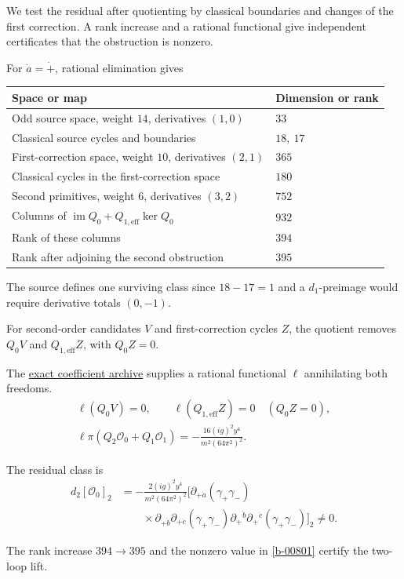 \documentclass[11pt]{article}
\numberwithin{equation}{section}
\numberwithin{figure}{section}
\numberwithin{table}{section}
\begin{document}
\begin{proofbox}
We test the residual after quotienting by classical boundaries and changes of the first correction. A rank increase and a rational functional give independent certificates that the obstruction is nonzero.

For $\dot a=\dot+$, rational elimination gives

{\small\renewcommand{\arraystretch}{1.25}\setlength{\tabcolsep}{4pt}
\begin{xltabular}{\linewidth}{@{}>{\raggedright\arraybackslash}X>{\raggedright\arraybackslash}X@{}}
\toprule
Space or map & Dimension or rank\\
\midrule\endhead
Odd source space, weight $14$, derivatives $(1,0)$ & $33$\\
Classical source cycles and boundaries & $18,\ 17$\\
First-correction space, weight $10$, derivatives $(2,1)$ & $365$\\
Classical cycles in the first-correction space & $180$\\
Second primitives, weight $6$, derivatives $(3,2)$ & $752$\\
Columns of $\operatorname{im}Q_0+Q_{1,\mathrm{eff}}\ker Q_0$ & $932$\\
Rank of these columns & $394$\\
Rank after adjoining the second obstruction & $395$\\
\bottomrule
\end{xltabular}}

The source defines one surviving class since $18-17=1$ and a $d_1$-preimage would require derivative totals $(0,-1)$.

For second-order candidates $V$ and first-correction cycles $Z$, the quotient removes $Q_0V$ and $Q_{1,\mathrm{eff}}Z$, with $Q_0Z=0$.

The \href{https://github.com/lbotao399-stack/All-loop-holomorphic-kernels/raw/main/SQED_two_loop_repro.zip}{exact coefficient archive} supplies a rational functional $\ell$ annihilating both freedoms.
\begin{equation}\label{b-00801}
\begin{gathered}
\ell(Q_0V)=0,\qquad
\ell(Q_{1,\mathrm{eff}}Z)=0\quad (Q_0Z=0),\\
\ell\pi(Q_2\mathcal O_0+Q_1\mathcal O_1)
=-\frac{16(ig)^2y^4}{m^2(64\pi^2)^2}.
\end{gathered}
\end{equation}

The residual class is
\begin{equation}\label{eq-SQEDlift}
\begin{aligned}
d_2[\mathcal O_0]_2
&=-\frac{2(ig)^2y^4}{m^2(64\pi^2)^2}\Big[
\partial_{+\dot a}(\gamma_+\gamma_-)\\[-2pt]
&\qquad\times\partial_{+\dot b}\partial_{+\dot c}(\gamma_+\gamma_-)
\partial_+{}^{\dot b}\partial_+{}^{\dot c}(\gamma_+\gamma_-)
\Big]_2\ne0.
\end{aligned}
\end{equation}

The rank increase $394\to395$ and the nonzero value in \eqref{b-00801} certify the two-loop lift.
\end{proofbox}
\end{document}
